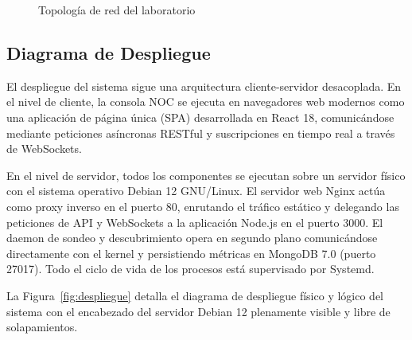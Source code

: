 \documentclass[12pt,a4paper]{report}
\begin{document}
\begin{figure}[H]
\caption{Topología de red del laboratorio}\label{fig:topologia_red}
\end{figure}

\subsection{Diagrama de Despliegue}

El despliegue del sistema sigue una arquitectura cliente-servidor desacoplada. En el nivel de cliente, la consola NOC se ejecuta en navegadores web modernos como una aplicación de página única (SPA) desarrollada en React 18, comunicándose mediante peticiones asíncronas RESTful y suscripciones en tiempo real a través de WebSockets.

En el nivel de servidor, todos los componentes se ejecutan sobre un servidor físico con el sistema operativo Debian 12 GNU/Linux. El servidor web Nginx actúa como proxy inverso en el puerto 80, enrutando el tráfico estático y delegando las peticiones de API y WebSockets a la aplicación Node.js en el puerto 3000. El daemon de sondeo y descubrimiento opera en segundo plano comunicándose directamente con el kernel y persistiendo métricas en MongoDB 7.0 (puerto 27017). Todo el ciclo de vida de los procesos está supervisado por Systemd.

La Figura~\ref{fig:despliegue} detalla el diagrama de despliegue físico y lógico del sistema con el encabezado del servidor Debian 12 plenamente visible y libre de solapamientos.
\end{document}
